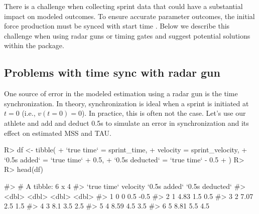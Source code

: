 \documentclass[
]{jss}
\begin{document}
There is a challenge when collecting sprint data that could have a substantial impact on modeled outcomes. To ensure accurate parameter outcomes, the initial force production must be synced with start time \citep{haugenPowerForceVelocityProfilingSprinting2020, haugenSprintMechanicalVariables2019}. Below we describe this challenge when using radar guns or timing gates and suggest potential solutions within the  package.

\hypertarget{problems-with-time-sync-with-radar-gun}{%
\subsection{Problems with time sync with radar gun}\label{problems-with-time-sync-with-radar-gun}}

One source of error in the modeled estimation using a radar gun is the time synchronization. In theory, synchronization is ideal when a sprint is initiated at \(t=0\) (i.e., \(v(t=0) = 0\)). In practice, this is often not the case. Let's use our athlete and add and deduct 0.5s to simulate an error in synchronization and its effect on estimated MSS and TAU.

\begin{CodeChunk}
\begin{CodeInput}
R> df <- tibble(
+   `true time` = sprint_time,
+   velocity = sprint_velocity,
+   `0.5s added` = `true time` + 0.5,
+   `0.5s deducted` = `true time` - 0.5
+ )
R> 
R> head(df)
\end{CodeInput}
\begin{CodeOutput}
#> # A tibble: 6 x 4
#>   `true time` velocity `0.5s added` `0.5s deducted`
#>         <dbl>    <dbl>        <dbl>           <dbl>
#> 1           0     0             0.5            -0.5
#> 2           1     4.83          1.5             0.5
#> 3           2     7.07          2.5             1.5
#> 4           3     8.1           3.5             2.5
#> 5           4     8.59          4.5             3.5
#> 6           5     8.81          5.5             4.5
\end{CodeOutput}
\end{CodeChunk}
\end{document}
